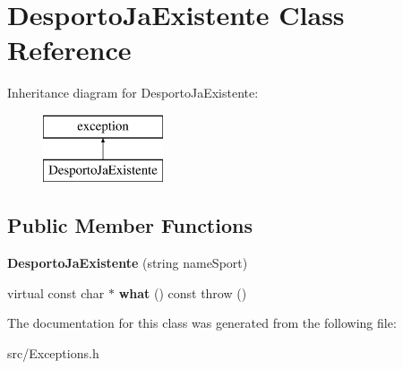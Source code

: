 \hypertarget{class_desporto_ja_existente}{}\section{Desporto\+Ja\+Existente Class Reference}
\label{class_desporto_ja_existente}
Inheritance diagram for Desporto\+Ja\+Existente\+:\begin{figure}[H]
\begin{center}
\leavevmode
\includegraphics[height=2.000000cm]{class_desporto_ja_existente}
\end{center}
\end{figure}
\subsection*{Public Member Functions}
\begin{DoxyCompactItemize}
\item 
\hypertarget{class_desporto_ja_existente_a915af6fa35b053a6e69c92e5812f4c9d}{}{\bfseries Desporto\+Ja\+Existente} (string name\+Sport)\label{class_desporto_ja_existente_a915af6fa35b053a6e69c92e5812f4c9d}

\item 
\hypertarget{class_desporto_ja_existente_ac65f5fc9efc431f555d4153fb546475f}{}virtual const char $\ast$ {\bfseries what} () const   throw ()\label{class_desporto_ja_existente_ac65f5fc9efc431f555d4153fb546475f}

\end{DoxyCompactItemize}


The documentation for this class was generated from the following file\+:\begin{DoxyCompactItemize}
\item 
src/Exceptions.\+h\end{DoxyCompactItemize}
